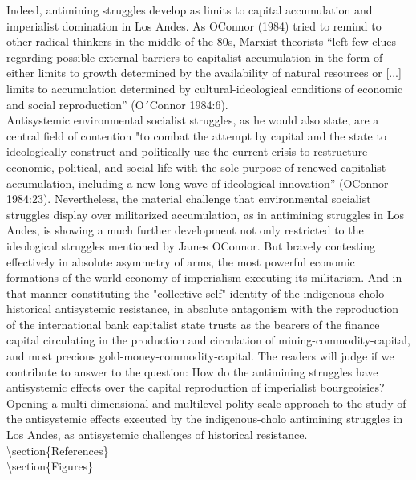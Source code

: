 \documentclass[
]{article}
\begin{document}
Indeed, antimining struggles develop as limits to capital accumulation
and imperialist domination in Los Andes. As O\textquotesingle Connor
(1984) tried to remind to other radical thinkers in the middle of the
80\textquotesingle s, Marxist theorists ``left few clues regarding
possible \textquotesingle external barriers\textquotesingle{} to
capitalist accumulation in the form of either \textquotesingle limits to
growth\textquotesingle{} determined by the availability of natural
resources or {[}...{]} limits to accumulation determined by
cultural-ideological conditions of economic and social reproduction''
(O´Connor 1984:6).\\
Antisystemic environmental socialist struggles, as he would also state,
are a central field of contention "to combat the attempt by capital and
the state to ideologically construct and politically use the current
crisis to restructure economic, political, and social life with the sole
purpose of renewed capitalist accumulation, including a new
\textquotesingle long wave\textquotesingle{} of ideological innovation''
(O\textquotesingle Connor 1984:23). Nevertheless, the material challenge
that environmental socialist struggles display over militarized
accumulation, as in antimining struggles in Los Andes, is showing a much
further development not only restricted to the ideological struggles
mentioned by James O\textquotesingle Connor. But bravely contesting
effectively in absolute asymmetry of arms, the most powerful economic
formations of the world-economy of imperialism executing its militarism.
And in that manner constituting the "collective self" identity of the
indigenous-cholo historical antisystemic resistance, in absolute
antagonism with the reproduction of the international bank capitalist
state trusts as the bearers of the finance capital circulating in the
production and circulation of mining-commodity-capital, and most
precious gold-money-commodity-capital. The readers will judge if we
contribute to answer to the question: How do the antimining struggles
have antisystemic effects over the capital reproduction of imperialist
bourgeoisies? Opening a multi-dimensional and multilevel polity scale
approach to the study of the antisystemic effects executed by the
indigenous-cholo antimining struggles in Los Andes, as antisystemic
challenges of historical resistance.\\
\textbackslash section\{References\}\\
\textbackslash section\{Figures\}

\hypertarget{widgetTitle}{}
\end{document}
